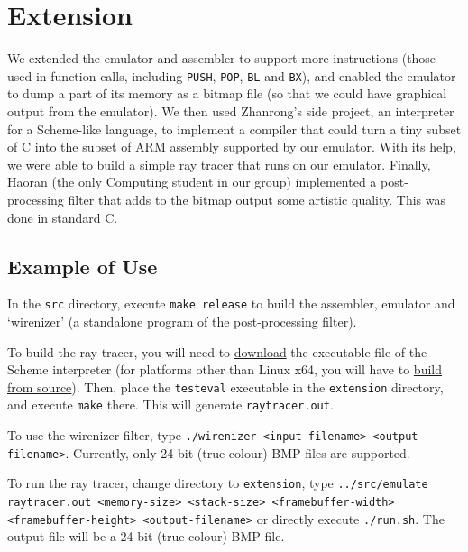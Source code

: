 \documentclass[11pt]{article}
\newcommand{\codeword}[1]{\texttt{#1}}
\begin{document}
\section{Extension}

We extended the emulator and assembler to support more instructions (those used in function calls, including \codeword{PUSH}, \codeword{POP}, \codeword{BL} and \codeword{BX}), and enabled the emulator to dump a part of its memory as a bitmap file (so that we could have graphical output from the emulator). We then used Zhanrong’s side project, an interpreter for a Scheme-like language, to implement a compiler that could turn a tiny subset of C into the subset of ARM assembly supported by our emulator. With its help, we were able to build a simple ray tracer that runs on our emulator. Finally, Haoran (the only Computing student in our group) implemented a post-processing filter that adds to the bitmap output some artistic quality. This was done in standard C.

\subsection{Example of Use}

In the \codeword{src} directory, execute \codeword{make release} to build the assembler, emulator and ‘wirenizer’ (a standalone program of the post-processing filter).

To build the ray tracer, you will need to \href{https://github.com/bridgekat/apimu/releases/tag/v0.1-alpha}{download} the executable file of the Scheme interpreter (for platforms other than Linux x64, you will have to \href{https://github.com/bridgekat/apimu#building-experimental}{build from source}). Then, place the \codeword{testeval} executable in the \codeword{extension} directory, and execute \codeword{make} there. This will generate \codeword{raytracer.out}.

To use the wirenizer filter, type \codeword{./wirenizer <input-filename> <output-filename>}. Currently, only 24-bit (true colour) BMP files are supported.

To run the ray tracer, change directory to \codeword{extension}, type \codeword{../src/emulate raytracer.out <memory-size> <stack-size> <framebuffer-width> <framebuffer-height> <output-filename>} or directly execute \codeword{./run.sh}. The output file will be a 24-bit (true colour) BMP file.
\end{document}
